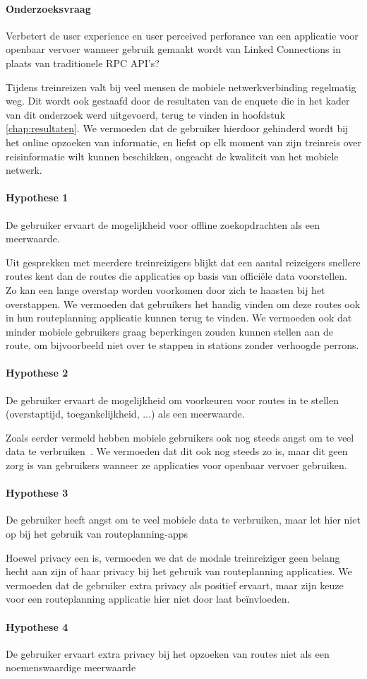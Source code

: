  \paragraph{Onderzoeksvraag} Verbetert de user experience en user perceived perforance van een applicatie voor openbaar vervoer wanneer gebruik gemaakt wordt van Linked Connections in plaats van traditionele RPC API's?
 
Tijdens treinreizen valt bij veel mensen de mobiele netwerkverbinding regelmatig weg. Dit wordt ook gestaafd door de resultaten van de enquete die in het kader van dit onderzoek werd uitgevoerd, terug te vinden in hoofdstuk \ref{chap:resultaten}. We vermoeden dat de gebruiker hierdoor gehinderd wordt bij het online opzoeken van informatie, en liefst op elk moment van zijn treinreis over reisinformatie wilt kunnen beschikken, ongeacht de kwaliteit van het mobiele netwerk.
 \paragraph{Hypothese 1} De gebruiker ervaart de mogelijkheid voor offline zoekopdrachten als een meerwaarde.
 
Uit gesprekken met meerdere treinreizigers blijkt dat een aantal reizeigers snellere routes kent dan de routes die applicaties op basis van officiële data voorstellen. Zo kan een lange overstap worden voorkomen door zich te haasten bij het overstappen. We vermoeden dat gebruikers het handig vinden om deze routes ook in hun routeplanning applicatie kunnen terug te vinden. We vermoeden ook dat minder mobiele gebruikers graag beperkingen zouden kunnen stellen aan de route, om bijvoorbeeld niet over te stappen in stations zonder verhoogde perrons.
 \paragraph{Hypothese 2} De gebruiker ervaart de mogelijkheid om voorkeuren voor routes in te stellen (overstaptijd, toegankelijkheid, ...) als een meerwaarde.
 
 Zoals eerder vermeld hebben mobiele gebruikers ook nog steeds angst om te veel data te verbruiken~\citep{ammelrooy17}. We vermoeden dat dit ook nog steeds zo is, maar dit geen zorg is van gebruikers wanneer ze applicaties voor openbaar vervoer gebruiken.
 \paragraph{Hypothese 3} De gebruiker heeft angst om te veel mobiele data te verbruiken, maar let hier niet op bij het gebruik van routeplanning-apps
 
 Hoewel privacy een  is, vermoeden we dat de modale treinreiziger geen belang hecht aan zijn of haar privacy bij het gebruik van routeplanning applicaties. We vermoeden dat de gebruiker extra privacy als positief ervaart, maar zijn keuze voor een routeplanning applicatie hier niet door laat beïnvloeden.
 \paragraph{Hypothese 4} De gebruiker ervaart extra privacy bij het opzoeken van routes niet als een noemenswaardige meerwaarde